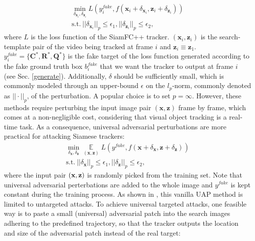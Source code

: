 \documentclass[journal]{IEEEtran}
\begin{document}
\begin{equation}
\begin{gathered}
  \min\limits_{\delta_{\textbf{x}_{i}}, \delta_{\textbf{z}_{i}}} L(y^{fake}_i, f(\textbf{x}_i + \delta_{\textbf{x}_{i}}, \textbf{z}_i + \delta_{\textbf{z}_{i}}))\\
  \text{s.t.}\ ||\delta_{\textbf{x}_i}||_p \le \epsilon_1, ||\delta_{\textbf{z}_i}||_p \le \epsilon_2,
\end{gathered}
\end{equation}
where $L$ is the loss function of the SiamFC++ tracker. $(\textbf{x}_i, \textbf{z}_i)$ is the search-template pair of the video being tracked at frame $i$ and $\textbf{z}_i \equiv \textbf{z}_1$. $y^{fake}_i=\{\textbf{C}^*, \textbf{R}^*, \textbf{Q}^*\}$ is the fake target of the loss function generated according to the fake ground truth box $b^{fake}_i$ that we want the tracker to output at frame $i$ (see Sec. \ref{generate}). 
Additionally, $\delta$ should be sufficiently small, which is commonly modeled through an upper-bound $\epsilon$ on the $l_p\text{-norm}$, commonly denoted as $||\cdot||_p$, of the perturbation. A popular choice is to set $p=\infty$.
However, these methods require perturbing the input image pair $(\textbf{x}, \textbf{z})$ frame by frame, which comes at a non-negligible cost, considering that visual object tracking is a real-time task.
As a consequence, universal adversarial perturbations \cite{UAP, shafahi2020universal} are more practical for attacking Siamese trackers:
\begin{equation}
  \begin{gathered}
    \min\limits_{\delta_\textbf{x}, \delta_\textbf{z}} \mathop{\mathbb{E}}\limits_{(\textbf{x}, \textbf{z})} L(y^{fake}, f(\textbf{x} + \delta_\textbf{x}, \textbf{z} + \delta_\textbf{z}))\\
    \text{s.t.}\ ||\delta_\textbf{x}||_p \le \epsilon_1, ||\delta_\textbf{z}||_p \le \epsilon_2,
  \end{gathered}
\end{equation}  
where the input pair $(\textbf x,\textbf z)$ is randomly picked from the training set. 
Note that universal adversarial perterbations are added to the whole image and $y^{fake}$ is kept constant during the training process.
As shown in \cite{hirano2020simple}, this vanilla UAP method is limited to untargeted attacks.
To achieve universal targeted attacks, one feasible way is to paste a small (universal) adversarial patch into the search images adhering to the predefined trajectory, so that the tracker outputs the location and size of the adversarial patch instead of the real target:
\end{document}
